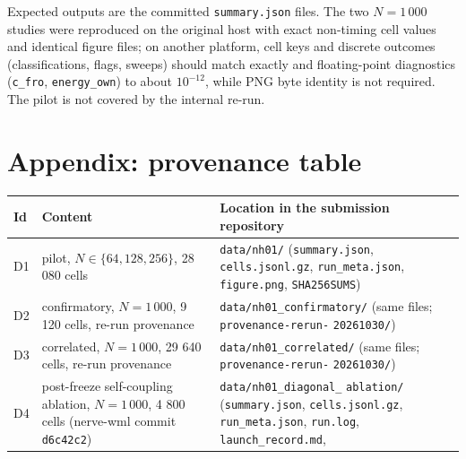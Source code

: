 Expected outputs are the committed \texttt{summary.json} files. The two
\(N = 1\,000\) studies were reproduced on the original host with exact
non-timing cell values and identical figure files; on another platform,
cell keys and discrete outcomes (classifications, flags, sweeps) should
match exactly and floating-point diagnostics (\texttt{c\_fro},
\texttt{energy\_own}) to about \(10^{-12}\), while PNG byte identity is
not required. The pilot is not covered by the internal re-run.

\section{Appendix: provenance table}\label{appendix-provenance-table}

{
\begin{longtable}[]{@{}
  >{\raggedright\arraybackslash}p{}
  >{\raggedright\arraybackslash}p{}
  >{\raggedright\arraybackslash}p{}@{}}
\toprule\noalign{}
\begin{minipage}[b]{\linewidth}\raggedright
Id
\end{minipage} & \begin{minipage}[b]{\linewidth}\raggedright
Content
\end{minipage} & \begin{minipage}[b]{\linewidth}\raggedright
Location in the submission repository
\end{minipage} \\
\midrule\noalign{}
\endhead
\bottomrule\noalign{}
\endlastfoot
D1 & pilot, \(N \in \{64, 128, 256\}\), 28 080 cells &
\texttt{data/nh01/} (\texttt{summary.json}, \texttt{cells.jsonl.gz},
\texttt{run\_meta.json}, \texttt{figure.png}, \texttt{SHA256SUMS}) \\
D2 & confirmatory, \(N = 1\,000\), 9 120 cells, re-run provenance &
\texttt{data/nh01\_confirmatory/} (same files;
\texttt{provenance-rerun-} \texttt{20261030/}) \\
D3 & correlated, \(N = 1\,000\), 29 640 cells, re-run provenance &
\texttt{data/nh01\_correlated/} (same files; \texttt{provenance-rerun-}
\texttt{20261030/}) \\
D4 & post-freeze self-coupling ablation, \(N = 1\,000\), 4 800 cells
(nerve-wml commit \texttt{d6c42c2}) & \texttt{data/nh01\_diagonal\_}
\texttt{ablation/} (\texttt{summary.json}, \texttt{cells.jsonl.gz},
\texttt{run\_meta.json}, \texttt{run.log}, \texttt{launch\_record.md},

\end{longtable}}
